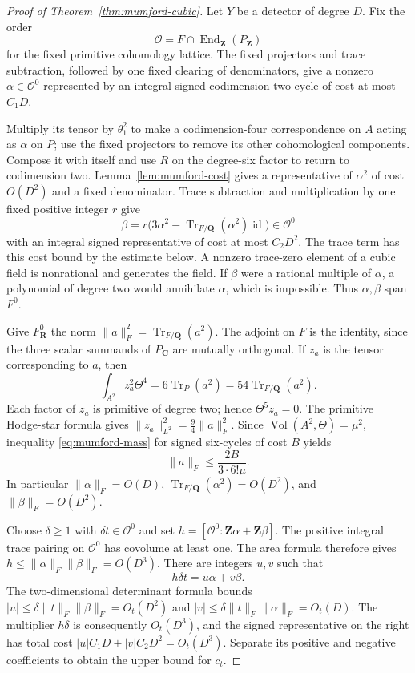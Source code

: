\documentclass[11pt]{article}
\theoremstyle{definition}
\theoremstyle{remark}
\newcommand{\Q}{\mathbf Q}
\newcommand{\Z}{\mathbf Z}
\newcommand{\R}{\mathbf R}
\newcommand{\C}{\mathbf C}
\begin{document}
\begin{proof}[Proof of Theorem~\ref{thm:mumford-cubic}]
Let $Y$ be a detector of degree $D$. Fix the order
\[
 \mathcal O=F\cap\operatorname{End}_{\Z}(P_{\Z})
\]
for the fixed primitive cohomology lattice. The fixed projectors and
trace subtraction, followed by one fixed clearing of denominators,
give a nonzero $\alpha\in\mathcal O^0$ represented by an integral
signed codimension-two cycle of cost at most $C_1D$.

Multiply its tensor by $\theta_1^2$ to make a codimension-four
correspondence on $A$ acting as $\alpha$ on $P$; use the fixed
projectors to remove its other cohomological components.
Compose it with itself and use $R$ on the degree-six factor to
return to codimension two. Lemma~\ref{lem:mumford-cost} gives a
representative of $\alpha^2$ of cost $O(D^2)$ and a fixed
denominator. Trace subtraction and multiplication by one fixed
positive integer $r$ give
\[
 \beta=r\bigl(3\alpha^2-
        \operatorname{Tr}_{F/\Q}(\alpha^2)\operatorname{id}\bigr)
      \in\mathcal O^0
\]
with an integral signed representative of cost at most $C_2D^2$.
The trace term has this cost bound by the estimate below.
A nonzero trace-zero element of a cubic field is nonrational and
generates the field. If $\beta$ were a rational multiple of $\alpha$,
a polynomial of degree two would annihilate $\alpha$, which is
impossible. Thus $\alpha,\beta$ span $F^0$.

Give $F^0_{\R}$ the norm
$\|a\|_F^2=\operatorname{Tr}_{F/\Q}(a^2)$.
The adjoint on $F$ is the identity, since the three scalar summands
of $P_\C$ are mutually orthogonal. If $z_a$ is the tensor
corresponding to $a$, then
\[
 \int_{A^2}z_a^2\Theta^4
   =6\operatorname{Tr}_{P}(a^2)
   =54\operatorname{Tr}_{F/\Q}(a^2).
\]
Each factor of $z_a$ is primitive of degree two; hence
$\Theta^5z_a=0$. The primitive Hodge-star formula gives
$\|z_a\|_{L^2}^2=\frac94\|a\|_F^2$.
Since $\operatorname{Vol}(A^2,\Theta)=\mu^2$, inequality
\eqref{eq:mumford-mass} for signed six-cycles of cost $B$ yields
\[
 \|a\|_F\leq\frac{2B}{3\cdot6!\mu}.
\]
In particular $\|\alpha\|_F=O(D)$,
$\operatorname{Tr}_{F/\Q}(\alpha^2)=O(D^2)$, and
$\|\beta\|_F=O(D^2)$.

Choose $\delta\geq1$ with $\delta t\in\mathcal O^0$ and set
$h=[\mathcal O^0:\Z\alpha+\Z\beta]$.
The positive integral trace pairing on $\mathcal O^0$ has
covolume at least one. The area formula therefore gives
$h\leq\|\alpha\|_F\|\beta\|_F=O(D^3)$.
There are integers $u,v$ such that
\[
 h\delta t=u\alpha+v\beta.
\]
The two-dimensional determinant formula bounds
$|u|\leq\delta\|t\|_F\|\beta\|_F=O_t(D^2)$ and
$|v|\leq\delta\|t\|_F\|\alpha\|_F=O_t(D)$.
The multiplier $h\delta$ is consequently $O_t(D^3)$, and the
signed representative on the right has total cost
$|u|C_1D+|v|C_2D^2=O_t(D^3)$.
Separate its positive and negative coefficients to obtain the
upper bound for $c_t$.


\end{proof}
\end{document}
